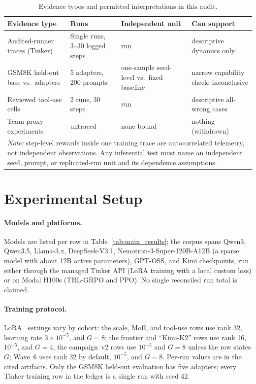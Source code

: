 \documentclass{article}
\begin{document}
\begin{table}[htbp]
\centering
\caption{Evidence types and permitted interpretations in this audit.}
\label{tab:evidence_types_detail}
\scriptsize
\begin{tabular}{p{3.2cm}p{3.0cm}p{2.5cm}p{2.5cm}}
\toprule
\textbf{Evidence type} & \textbf{Runs} & \textbf{Independent unit} & \textbf{Can support} \\
\midrule
Audited-runner traces (Tinker) & Single runs, 3--30 logged steps & run & descriptive dynamics only \\
GSM8K held-out base vs.\ adapters & 5 adapters, 200 prompts & one-sample seed-level vs.\ fixed baseline & narrow capability check; inconclusive \\
Reviewed tool-use cells & 2 runs, 30 steps & run & descriptive all-wrong cases \\
Team proxy experiments & untraced & none bound & nothing (withdrawn) \\
\midrule
\multicolumn{4}{p{11.2cm}}{\small \textit{Note:} step-level rewards inside one training trace are autocorrelated telemetry, not independent observations. Any inferential test must name an independent seed, prompt, or replicated-run unit and its dependence assumptions.} \\
\bottomrule
\end{tabular}
\end{table}

\section{Experimental Setup}
\label{sec:setup}

\paragraph{Models and platforms.}
Models are listed per row in Table~\ref{tab:main_results}; the corpus spans
Qwen3, Qwen3.5, Llama-3.x, DeepSeek-V3.1, Nemotron-3-Super-120B-A12B (a sparse
model with about 12B active parameters), GPT-OSS, and Kimi checkpoints, run
either through the managed Tinker API (LoRA training with a local custom loss)
or on Modal H100s (TRL-GRPO and PPO). No single reconciled run total is
claimed.

\paragraph{Training protocol.}
LoRA~\cite{hu2022lora} settings vary by cohort: the scale, MoE, and tool-use
rows use rank 32, learning rate $3\times10^{-5}$, and $G=8$; the frontier and
``Kimi-K2'' rows use rank 16, $10^{-5}$, and $G=4$; the campaign~v2 rows use
$10^{-5}$ and $G=8$ unless the row states $G$; Wave~6 uses rank 32 by default,
$10^{-5}$, and $G=8$. Per-run values are in the cited artifacts.
Only the GSM8K held-out evaluation has five adapters; every Tinker training row
in the ledger is a single run with seed 42.
\end{document}
